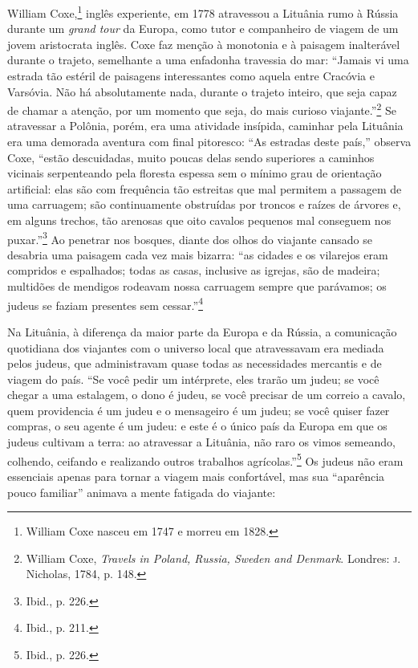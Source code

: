 William Coxe,\footnote{William Coxe nasceu em 1747 e morreu em 1828.} inglês experiente, em 1778 atravessou a
Lituânia rumo à Rússia durante um \textit{grand tour} da Europa, como
tutor e companheiro de viagem de um jovem aristocrata inglês. Coxe faz
menção à monotonia e à paisagem inalterável durante o trajeto,
semelhante a uma enfadonha travessia do mar: ``Jamais vi uma estrada tão
estéril de paisagens interessantes como aquela entre Cracóvia e
Varsóvia. Não há absolutamente nada, durante o trajeto inteiro, que seja
capaz de chamar a atenção, por um momento que seja, do mais curioso
viajante.''\footnote{William Coxe, \textit{Travels in Poland, Russia, Sweden and Denmark}. Londres: \textsc{j}.\,Nicholas, 1784, p. 148.} Se atravessar a Polônia, porém, era uma atividade insípida, caminhar pela Lituânia era
uma demorada aventura com final pitoresco: ``As estradas deste país,''
observa Coxe, ``estão descuidadas, muito poucas delas sendo superiores a
caminhos vicinais serpenteando pela floresta espessa sem o mínimo grau
de orientação artificial: elas são com frequência tão estreitas que mal
permitem a passagem de uma carruagem; são continuamente obstruídas por
troncos e raízes de árvores e, em alguns trechos, tão arenosas que oito
cavalos pequenos mal conseguem nos puxar.''\footnote{Ibid., p. 226.} Ao
penetrar nos bosques, diante dos olhos do viajante cansado se desabria
uma paisagem cada vez mais bizarra: ``as cidades e os vilarejos eram
compridos e espalhados; todas as casas, inclusive as igrejas, são de
madeira; multidões de mendigos rodeavam nossa carruagem sempre que
parávamos; os judeus se faziam presentes sem cessar.''\footnote{Ibid., p. 211.}

Na Lituânia, à diferença da maior parte da Europa e da Rússia, a
comunicação quotidiana dos viajantes com o universo local que
atravessavam era mediada pelos judeus, que administravam quase todas as
necessidades mercantis e de viagem do país. ``Se você pedir um
intérprete, eles trarão um judeu; se você chegar a uma estalagem, o dono
é judeu, se você precisar de um correio a cavalo, quem providencia é um
judeu e o mensageiro é um judeu; se você quiser fazer compras, o seu
agente é um judeu: e este é o único país da Europa em que os judeus
cultivam a terra: ao atravessar a Lituânia, não raro os vimos semeando,
colhendo, ceifando e realizando outros trabalhos agrícolas.''\footnote{Ibid., p. 226.} Os judeus não eram essenciais apenas para tornar a viagem mais confortável, mas sua ``aparência pouco familiar'' animava a mente
fatigada do viajante:

